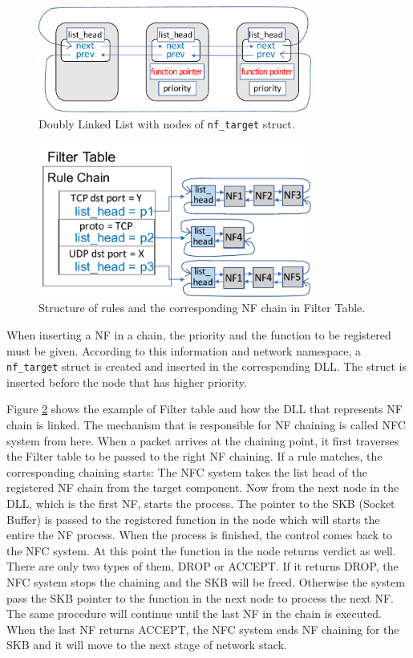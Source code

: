 \begin{figure}
	\centering
	\includegraphics[width=90mm]{pics/dll.pdf}
	\caption{Doubly Linked List with nodes of {\tt nf\_target} struct.}
	\label{fig: dll}
\end{figure}

\begin{figure}
	\centering
	\includegraphics[width=90mm]{pics/list_head.pdf}
	\caption{Structure of rules and the corresponding NF chain in Filter Table.}
	\label{fig: listhead}
\end{figure}

 When inserting a NF in a chain, the priority and the function to be registered must be given. According to this information and network namespace, a {\tt nf\_target} struct is created and inserted in the corresponding DLL. The struct is inserted before the node that has higher priority. 
 
 Figure \ref{fig: listhead} shows the example of Filter table and how the DLL that represents NF chain is linked. The mechanism that is responsible for NF chaining is called NFC system from here. When a packet arrives at the chaining point, it first traverses the Filter table to be passed to the right NF chaining. If a rule matches, the corresponding chaining starts: The NFC system takes the list head of the registered NF chain from the target component. Now from the next node in the DLL, which is the first NF, starts the process. The pointer to the SKB (Socket Buffer) is passed to the registered function in the node which will starts the entire the NF process. When the process is finished, the control comes back to the NFC system. At this point the function in the node returns verdict as well. There are only two types of them, DROP or ACCEPT. If it returns DROP, the NFC system stops the chaining and the SKB will be freed. Otherwise the system pass the SKB pointer to the function in the next node to process the next NF. The same procedure will continue until the last NF in the chain is executed. When the last NF returns ACCEPT, the NFC system ends NF chaining for the SKB and it will move to the next stage of network stack. 

